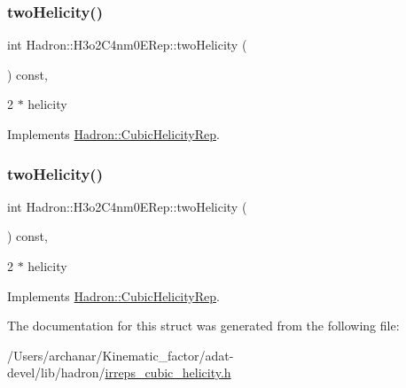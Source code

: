 \subsubsection{\texorpdfstring{twoHelicity()}{twoHelicity()}\hspace{0.1cm}{\footnotesize\ttfamily [2/3]}}
{\footnotesize\ttfamily int Hadron\+::\+H3o2\+C4nm0\+E\+Rep\+::two\+Helicity (\begin{DoxyParamCaption}{ }\end{DoxyParamCaption}) const\hspace{0.3cm}{\ttfamily [inline]}, {\ttfamily [virtual]}}

2 $\ast$ helicity 

Implements \mbox{\hyperlink{structHadron_1_1CubicHelicityRep_af507aa56fc2747eacc8cb6c96db31ecc}{Hadron\+::\+Cubic\+Helicity\+Rep}}.

\mbox{\label{structHadron_1_1H3o2C4nm0ERep_a02b0a0895d49ca7a0dd5aa6cdacc877e}} 
\subsubsection{\texorpdfstring{twoHelicity()}{twoHelicity()}\hspace{0.1cm}{\footnotesize\ttfamily [3/3]}}
{\footnotesize\ttfamily int Hadron\+::\+H3o2\+C4nm0\+E\+Rep\+::two\+Helicity (\begin{DoxyParamCaption}{ }\end{DoxyParamCaption}) const\hspace{0.3cm}{\ttfamily [inline]}, {\ttfamily [virtual]}}

2 $\ast$ helicity 

Implements \mbox{\hyperlink{structHadron_1_1CubicHelicityRep_af507aa56fc2747eacc8cb6c96db31ecc}{Hadron\+::\+Cubic\+Helicity\+Rep}}.



The documentation for this struct was generated from the following file\+:\begin{DoxyCompactItemize}
\item 
/\+Users/archanar/\+Kinematic\+\_\+factor/adat-\/devel/lib/hadron/\mbox{\hyperlink{adat-devel_2lib_2hadron_2irreps__cubic__helicity_8h}{irreps\+\_\+cubic\+\_\+helicity.\+h}}\end{DoxyCompactItemize}
